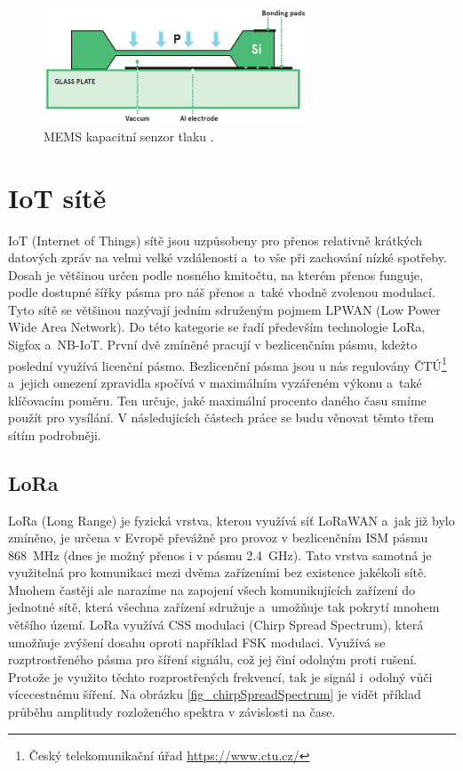 \begin{figure}
    \centering
    \includegraphics[width=0.7\textwidth]{obrazky/MEMS_capacitive_sensor.jpg}
    \caption[MEMS kapacitní senzor tlaku.]{MEMS kapacitní senzor tlaku \cite{AvnetMEMS}.}
    \label{fig_memsCapacitiveSensor}
\end{figure}

\section{IoT sítě}

IoT (Internet of Things) sítě jsou uzpůsobeny pro přenos relativně krátkých datových zpráv na velmi velké vzdálenosti a~to vše při zachování nízké spotřeby. Dosah je většinou určen podle nosného kmitočtu, na kterém přenos funguje, podle dostupné šířky pásma pro náš přenos a~také vhodně zvolenou modulací. Tyto sítě se většinou nazývají jedním sdruženým pojmem LPWAN (Low Power Wide Area Network). Do této kategorie se řadí především technologie LoRa, Sigfox a~NB-IoT. První dvě zmíněné pracují v bezlicenčním pásmu, kdežto poslední využívá licenční pásmo. Bezlicenční pásma jsou u nás regulovány ČTÚ\footnote{Český telekomunikační úřad \url{https://www.ctu.cz/}} a~jejich omezení zpravidla spočívá v maximálním vyzářeném výkonu a~také klíčovacím poměru. Ten určuje, jaké maximální procento daného času smíme použít pro vysílání. V následujících částech práce se budu věnovat těmto třem sítím podrobněji.

\subsection{LoRa}

LoRa (Long Range) je fyzická vrstva, kterou využívá síť LoRaWAN a~jak již bylo zmíněno, je určena v Evropě převážně pro provoz v bezlicenčním ISM pásmu \SI{868}{\mega\hertz} (dnes je možný přenos i v pásmu \SI{2.4}{\giga\hertz}). Tato vrstva samotná je využitelná pro komunikaci mezi dvěma zařízeními bez existence jakékoli sítě. Mnohem častěji ale narazíme na zapojení všech komunikujících zařízení do jednotné sítě, která všechna zařízení sdružuje a~umožňuje tak pokrytí mnohem většího území. LoRa využívá CSS modulaci (Chirp Spread Spectrum), která umožňuje zvýšení dosahu oproti například FSK modulaci. Využívá se rozptrostřeného pásma pro šíření signálu, což jej činí odolným proti rušení. Protože je využito těchto rozprostřených frekvencí, tak je signál i~odolný vůči vícecestnému šíření. Na obrázku \ref{fig_chirpSpreadSpectrum} je vidět příklad průběhu amplitudy rozloženého spektra v závislosti na čase.

